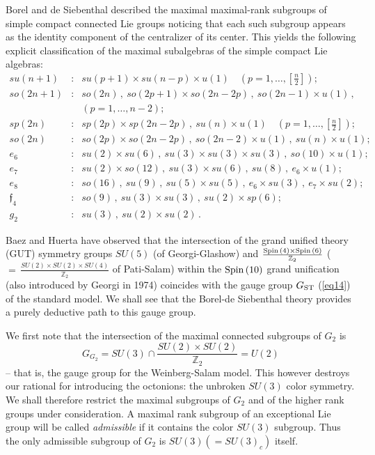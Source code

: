 \documentclass{article}
\newcommand{\be}{\begin{equation}}
\newcommand{\ee}{\end{equation}}
\begin{document}
Borel and de Siebenthal \cite{BdS} described the maximal maximal-rank subgroups of simple compact connected Lie groups noticing that each such subgroup appears as the identity component of the centralizer of its center. This yields the following explicit classification of the maximal subalgebras of the simple compact Lie algebras:
\begin{eqnarray}
\label{eq41}
su (n+1) &: &su(p+1) \times su(n-p) \times u(1) \quad (p=1 , \ldots , \left[ \frac n2 \right]); \nonumber \\
so (2n+1) &: &so(2n) \, , \ so (2p+1) \times so (2n-2p) \, , \ so (2n-1) \times u(1) \, , \nonumber \\
&&(p=1,\ldots , n-2); \nonumber \\
sp (2n) &: &sp(2p) \times sp (2n-2p) \, , \ su (n) \times u(1) \quad (p=1, \ldots , \left[ \frac n2 \right]); \nonumber \\
so (2n) &: &so (2p) \times so (2n-2p) \, , \ so (2n-2) \times u(1) \, , \ su (n) \times u(1); \nonumber \\
e_6 &: &su (2) \times su (6) \, , \ su (3) \times su (3) \times su (3) \, , \ so (10) \times u(1); \nonumber \\
e_7 &: &su (2) \times so (12) \, , \ su (3) \times su (6) \, , \ su(8) \, , \ e_6 \times u(1); \nonumber \\
e_8 &: &so(16) \, , \ su (9) \, , \ su (5) \times su (5) \, , \ e_6 \times su (3) \, , \ e_7 \times su (2); \nonumber \\
{\mathfrak f}_4 &: &so(9) \, , \ su (3) \times su (3) \, , \ su (2) \times sp (6) ; \nonumber \\
g_2 &: &su (3) \, , \ su (2) \times su (2) \, .
\end{eqnarray}

\noindent Baez and Huerta \cite{BH} have observed that the intersection of the grand unified theory (GUT) symmetry groups $SU (5)$ (of Georgi-Glashow) and $\frac{{\rm Spin} \, (4) \times {\rm Spin} \, (6)}{{\mathbb Z}_2}$ ($= \, \frac{SU(2) \times SU(2) \times SU(4)}{{\mathbb Z}_2}$ of Pati-Salam) within the ${\rm Spin} \, (10)$ grand unification (also introduced by Georgi in 1974) coincides with the gauge group $G_{\rm ST}$ (\ref{eq14}) of the standard model. We shall see that the Borel-de Siebenthal theory provides a purely deductive path to this gauge group.

\smallskip

We first note that the intersection  of the maximal connected subgroups of $G_2$ is
\be
\label{eq42}
G_{G_2} = SU(3) \cap \frac{SU (2) \times SU (2)}{{\mathbb Z}_2} = U(2)
\ee
-- that is, the gauge group for the Weinberg-Salam model. This however destroys our rational for introducing the octonions: the unbroken $SU(3)$ color symmetry. We shall therefore restrict the maximal subgroups of $G_2$ and of the higher rank groups under consideration. A maximal rank subgroup of an exceptional Lie group will be called \textit{admissible} if it contains the color $SU(3)$ subgroup. Thus the only admissible subgroup of $G_2$ is $SU(3)(=SU(3)_c)$ itself.
\end{document}
